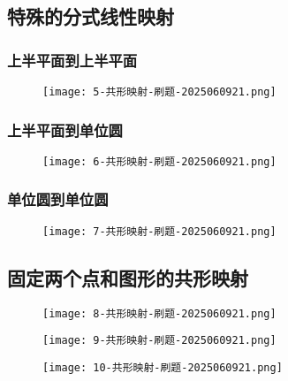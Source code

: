 \subsection{特殊的分式线性映射}

\subsubsection{上半平面到上半平面}

\begin{figure}[H]
\centering
\texttt{[image: 5-共形映射-刷题-2025060921.png]}
\label{}
\end{figure}

\subsubsection{上半平面到单位圆}

\begin{figure}[H]
\centering
\texttt{[image: 6-共形映射-刷题-2025060921.png]}
\label{}
\end{figure}

\subsubsection{单位圆到单位圆}

\begin{figure}[H]
\centering
\texttt{[image: 7-共形映射-刷题-2025060921.png]}
\label{}
\end{figure}

\subsection{固定两个点和图形的共形映射}

\begin{figure}[H]
\centering
\texttt{[image: 8-共形映射-刷题-2025060921.png]}
\label{}
\end{figure}

\begin{figure}[H]
\centering
\texttt{[image: 9-共形映射-刷题-2025060921.png]}
\label{}
\end{figure}
\begin{figure}[H]
\centering
\texttt{[image: 10-共形映射-刷题-2025060921.png]}
\label{}
\end{figure}

